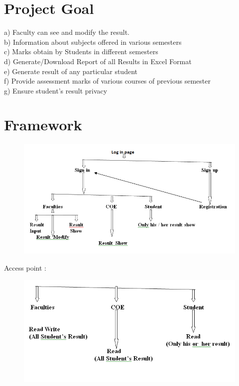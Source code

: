 \documentclass{article}
\begin{document}
\begin{titlepage}
\section{Project Goal}\label{sec intro}
a)	Faculty can see and modify the result. \\
b)	Information about subjects offered in various semesters \\
c)	Marks obtain by Students in different semesters\\
d)	Generate/Download Report of all Results in Excel Format\\
e)	Generate result of any particular student\\
f)	Provide assessment marks of various courses of previous semester\\
g)	Ensure student’s result privacy \\


\vspace{5cm}


\section{Framework}\label{oject}

\begin{figure}[h!]
\centering
\includegraphics[width=1.1\textwidth]{Metho.png}

\end{figure}

\label{oject}

\vspace{0.5cm}

Access point :

\begin{figure}[h!]
\centering
\includegraphics[width=1.1\textwidth]{Access.png}


\end{figure}
\end{titlepage}
\end{document}

